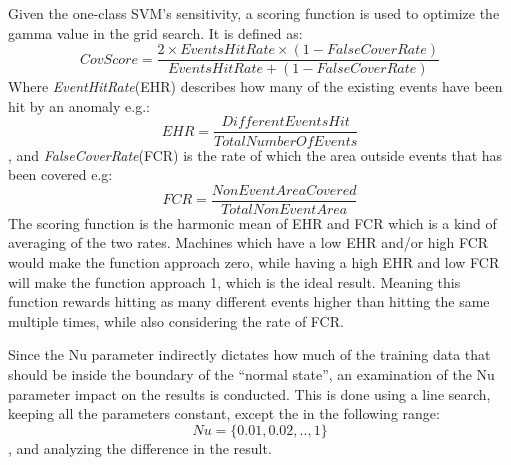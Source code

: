 Given the one-class SVM's sensitivity, a scoring function is used to optimize the gamma value in the grid search. It is defined as: 
\[CovScore = \frac{2 \times EventsHitRate \times (1-FalseCoverRate)}{EventsHitRate + (1-FalseCoverRate)}\]
Where \textit{EventHitRate}(EHR) describes how many of the existing events have been hit by an anomaly e.g.:
\[EHR = \frac{DifferentEventsHit}{TotalNumberOfEvents}\]
, and \textit{FalseCoverRate}(FCR) is the rate of which the area outside events that has been covered e.g:
\[FCR = \frac{NonEventAreaCovered}{TotalNonEventArea}\]
The scoring function is the harmonic mean of EHR and FCR which is a kind of averaging of the two rates.
Machines which have a low EHR and/or high FCR would make the function approach zero, while having a high EHR and low FCR will make the function approach 1, which is the ideal result.
Meaning this function rewards hitting as many different events higher than hitting the same multiple times, while also considering the rate of FCR.

Since the Nu parameter indirectly dictates how much of the training data that should be inside the boundary of the ``normal state'', an examination of the Nu parameter impact on the results is conducted.
This is done using a line search, keeping all the parameters constant, except the in the following range:
\[Nu = \{0.01, 0.02,.., 1\}\], and analyzing the difference in the result. 
